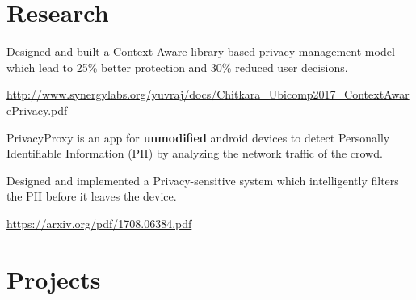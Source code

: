 \documentclass[]{deedy-resume-openfont}
\begin{document}
\begin{minipage}[t]{0.66\textwidth}

\section{Research}
\begin{tightemize}
\item Designed and built a Context-Aware library based privacy management model which lead to 25\% better protection and 30\% reduced user decisions.
\item \url{http://www.synergylabs.org/yuvraj/docs/Chitkara_Ubicomp2017_ContextAwarePrivacy.pdf}
\end{tightemize}
\sectionsep

\begin{tightemize} 
\item PrivacyProxy is an app for \textbf{unmodified} android devices to detect Personally Identifiable Information (PII) by analyzing the network traffic of the crowd.
\item Designed and implemented a Privacy-sensitive system which intelligently filters the PII before it leaves the device.
\item \url{https://arxiv.org/pdf/1708.06384.pdf}
\end{tightemize}
\sectionsep

\section{Projects}


\end{minipage}
\end{document}
